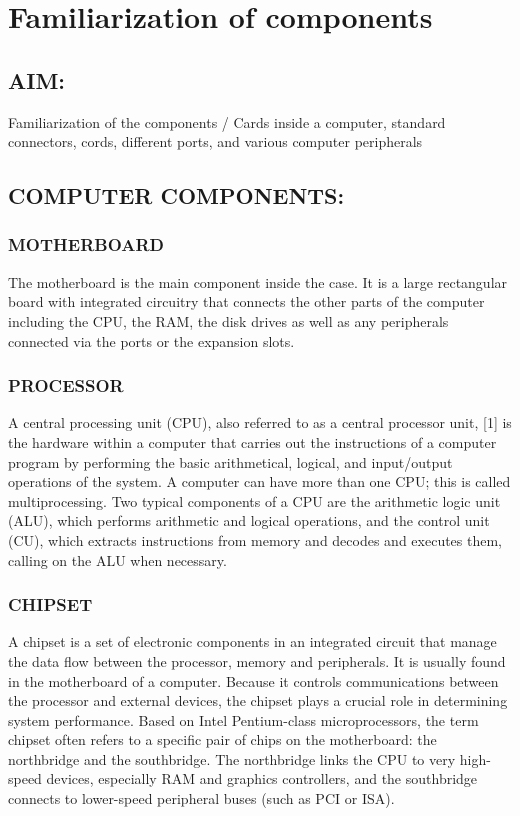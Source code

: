 \documentclass[a4paper,28pt,twoside,openright]{report}
\begin{document}
%
%
\cleardoublepage
{}
\pagestyle{empty}
\tableofcontents
\cleardoublepage
\pagestyle{plain}
%
\chapter{Familiarization of components}
%
%
%
\section*{AIM:}
	Familiarization of the components / Cards inside a computer, standard connectors, cords, different ports,
	and various computer peripherals
	
\section*{COMPUTER COMPONENTS:}
\subsection*{MOTHERBOARD}
	The motherboard is the main component inside the case. It is a large rectangular board with integrated circuitry
	that connects the other parts of the computer including the CPU, the RAM, the disk drives as well as any peripherals 	connected via the ports or the expansion slots.
\subsection*{PROCESSOR}
	A central processing unit (CPU), also referred to as a central processor unit,
	[1] is the hardware within
	a computer that carries out the instructions of a computer program by performing the basic arithmetical, logical,
	and input/output operations of the system. A computer can have more than one CPU; this is
	called multiprocessing. Two typical components of a CPU are the arithmetic logic unit (ALU), which
	performs arithmetic and logical operations, and the control unit (CU), which extracts instructions
	from memory and decodes and executes them, calling on the ALU when necessary.
\subsection*{CHIPSET}
	A chipset is a set of electronic components in an integrated circuit that manage the data flow between the
	processor, memory and peripherals. It is usually found in the motherboard of a computer. Because it controls 			communications between the
	processor and external devices, the chipset plays a crucial role in determining system performance. Based
	on Intel Pentium-class microprocessors, the term chipset often refers to a specific pair of chips on the
	motherboard: the northbridge and the southbridge. The northbridge links the CPU to very high-speed devices,
	especially RAM and graphics controllers, and the southbridge connects to lower-speed peripheral buses (such
	as PCI or ISA). 
\end{document}
